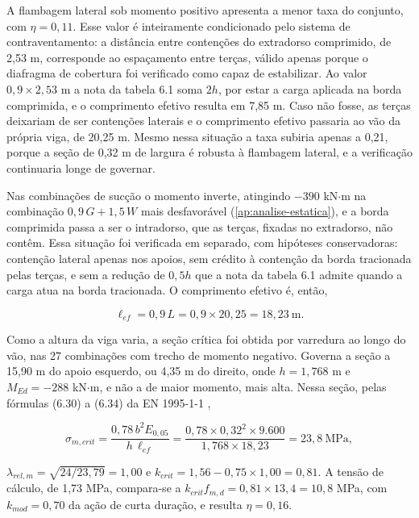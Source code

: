 A flambagem lateral sob momento positivo apresenta a menor taxa do conjunto, com
$\eta = 0{,}11$. Esse valor é inteiramente condicionado pelo sistema de
contraventamento: a distância entre contenções do extradorso comprimido, de
2,53 m, corresponde ao espaçamento entre terças, válido apenas porque o
diafragma de cobertura foi verificado como capaz de estabilizar. Ao valor
$0{,}9 \times 2{,}53$ m a nota da tabela 6.1 soma $2h$, por estar a carga
aplicada na borda comprimida, e o comprimento efetivo resulta em 7,85 m.
Caso não fosse, as terças deixariam de ser contenções laterais e o comprimento
efetivo passaria ao vão da própria viga, de 20,25 m. Mesmo nessa situação a taxa
subiria apenas a 0,21, porque a seção de 0,32 m de largura é robusta à
flambagem lateral, e a verificação continuaria longe de governar.

Nas combinações de sucção o momento inverte, atingindo $-390$ kN$\cdot$m na
combinação $0{,}9\,G + 1{,}5\,W$ mais desfavorável (\autoref{ap:analise-estatica}), e a borda comprimida passa a ser o intradorso,
que as terças, fixadas no extradorso, não contêm. Essa situação foi verificada
em separado, com hipóteses conservadoras: contenção lateral apenas nos apoios,
sem crédito à contenção da borda tracionada pelas terças, e sem a redução de
$0{,}5h$ que a nota da tabela 6.1 admite quando a carga atua na borda
tracionada. O comprimento efetivo é, então,

\begin{equation}
    \ell_{ef} = 0{,}9\,L = 0{,}9 \times 20{,}25 = 18{,}23~\text{m}.
    \label{eq:lef-succao}
\end{equation}

\noindent
Como a altura da viga varia, a seção crítica foi obtida por varredura ao longo
do vão, nas 27 combinações com trecho de momento negativo. Governa a seção
a 15,90 m do apoio esquerdo, ou 4,35 m do direito, onde $h = 1{,}768$ m e $M_{Ed} = -288$ kN$\cdot$m, e não a de
maior momento, mais alta. Nessa seção, pelas fórmulas (6.30) a (6.34) da
EN 1995-1-1 \cite{EN1995-1-1:2004},

\begin{equation}
    \sigma_{m,crit} = \frac{0{,}78\,b^2 E_{0,05}}{h\,\ell_{ef}}
    = \frac{0{,}78 \times 0{,}32^2 \times 9.600}{1{,}768 \times 18{,}23}
    = 23{,}8~\text{MPa},
\end{equation}

\noindent
$\lambda_{rel,m} = \sqrt{24/23{,}79} = 1{,}00$ e
$k_{crit} = 1{,}56 - 0{,}75 \times 1{,}00 = 0{,}81$. A tensão de cálculo, de
1,73 MPa, compara-se a $k_{crit} f_{m,d} = 0{,}81 \times 13{,}4 = 10{,}8$ MPa,
com $k_{mod} = 0{,}70$ da ação de curta duração, e resulta $\eta = 0{,}16$.


